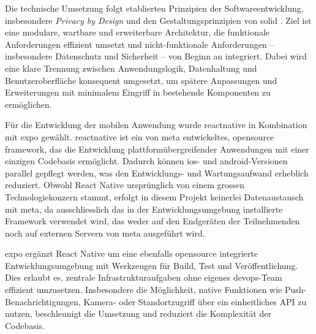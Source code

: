 Die technische Umsetzung folgt etablierten Prinzipien der Softwareentwicklung, insbesondere \textit{Privacy by Design} \parencite{cavoukianPrivacyDesign72009} und den Gestaltungsprinzipien von \gls{solid} \parencite{martinCleanArchitectureCraftsmans2018}. Ziel ist eine modulare, wartbare und erweiterbare Architektur, die funktionale Anforderungen effizient umsetzt und nicht-funktionale Anforderungen -- insbesondere Datenschutz und Sicherheit -- von Beginn an integriert. Dabei wird eine klare Trennung zwischen Anwendungslogik, Datenhaltung und Benutzeroberfläche konsequent umgesetzt, um spätere Anpassungen und Erweiterungen mit minimalem Eingriff in bestehende Komponenten zu ermöglichen.

Für die Entwicklung der mobilen Anwendung wurde \gls{reactnative} in Kombination mit \gls{expo} gewählt. \gls{reactnative} ist ein von \gls{meta} entwickeltes, \gls{opensource} \gls{framework}, das die Entwicklung plattformübergreifender Anwendungen mit einer einzigen Codebasis ermöglicht. Dadurch können \gls{ios}- und \gls{android}-Versionen parallel gepflegt werden, was den Entwicklungs- und Wartungsaufwand erheblich reduziert. Obwohl React Native ursprünglich von einem grossen Technologiekonzern stammt, erfolgt in diesem Projekt keinerlei Datenaustausch mit \gls{meta}, da ausschliesslich das in der Entwicklungsumgebung installierte Framework verwendet wird, das weder auf den Endgeräten der Teilnehmenden noch auf externen Servern von \gls{meta} ausgeführt wird.

\gls{expo} ergänzt React Native um eine ebenfalls \gls{opensource} integrierte Entwicklungsumgebung mit Werkzeugen für Build, Test und Veröffentlichung. Dies erlaubt es, zentrale Infrastrukturaufgaben ohne eigenes \gls{devops}-Team effizient umzusetzen. Insbesondere die Möglichkeit, native Funktionen wie Push-Benachrichtigungen, Kamera- oder Standortzugriff über ein einheitliches API zu nutzen, beschleunigt die Umsetzung und reduziert die Komplexität der Codebasis. 


